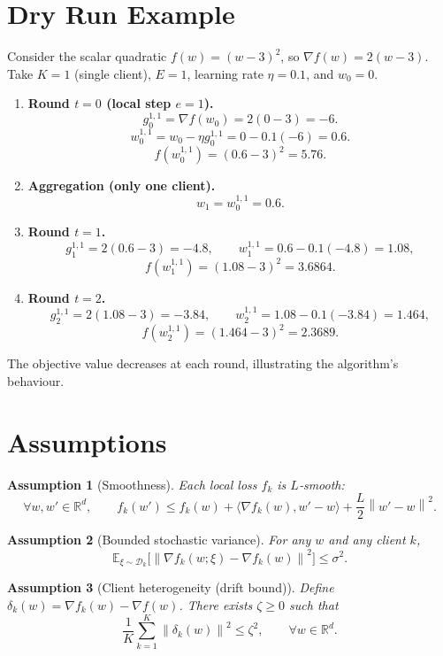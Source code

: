 \documentclass{article}
\newtheorem{assumption}{Assumption}
\newcommand{\EE}{\mathbb{E}}
\newcommand{\RR}{\mathbb{R}}
\newcommand{\norm}[1]{\left\lVert#1\right\rVert}
\newcommand{\inner}[2]{\langle #1,#2\rangle}
\begin{document}
\section*{Dry Run Example}
Consider the scalar quadratic $f(w)=(w-3)^2$, so $\nabla f(w)=2(w-3)$.  
Take $K=1$ (single client), $E=1$, learning rate $\eta=0.1$, and $w_0=0$.

\begin{enumerate}
\item \textbf{Round $t=0$ (local step $e=1$).}
\[
g_0^{1,1}= \nabla f( w_0 ) = 2(0-3) = -6 .
\]
\[
w_{0}^{1,1}= w_0 - \eta g_0^{1,1}=0-0.1(-6)=0.6 .
\]
\[
f(w_{0}^{1,1}) = (0.6-3)^2 = 5.76 .
\]

\item \textbf{Aggregation (only one client).}
\[
w_1 = w_{0}^{1,1}=0.6 .
\]

\item \textbf{Round $t=1$.}
\[
g_1^{1,1}=2(0.6-3) = -4.8,
\qquad
w_{1}^{1,1}=0.6-0.1(-4.8)=1.08,
\]
\[
f(w_{1}^{1,1})=(1.08-3)^2=3.6864 .
\]

\item \textbf{Round $t=2$.}
\[
g_2^{1,1}=2(1.08-3)=-3.84,
\qquad
w_{2}^{1,1}=1.08-0.1(-3.84)=1.464,
\]
\[
f(w_{2}^{1,1})=(1.464-3)^2=2.3689 .
\]
\end{enumerate}
The objective value decreases at each round, illustrating the algorithm’s behaviour.

\newpage
\section*{Assumptions}
\begin{assumption}[Smoothness]
Each local loss $f_k$ is $L$‑smooth:
\[
\forall w,w'\in\RR^d,\qquad 
f_k(w')\le f_k(w)+\inner{\nabla f_k(w)}{w'-w}
+\frac{L}{2}\norm{w'-w}^2 .
\tag{A1}
\]
\end{assumption}

\begin{assumption}[Bounded stochastic variance]
For any $w$ and any client $k$,
\[
\EE_{\xi\sim\mathcal{D}_k}\!\bigl[\norm{\nabla f_k(w;\xi)-\nabla f_k(w)}^2\bigr]\le\sigma^2 .
\tag{A2}
\]

\end{assumption}

\begin{assumption}[Client heterogeneity (drift bound)]
Define $\delta_k(w)=\nabla f_k(w)-\nabla f(w)$. There exists $\zeta\ge0$ such that
\[
\frac1K\sum_{k=1}^{K}\norm{\delta_k(w)}^2\le \zeta^2 ,\qquad\forall w\in\RR^d .
\tag{A3}
\]
\end{assumption}
\end{document}

